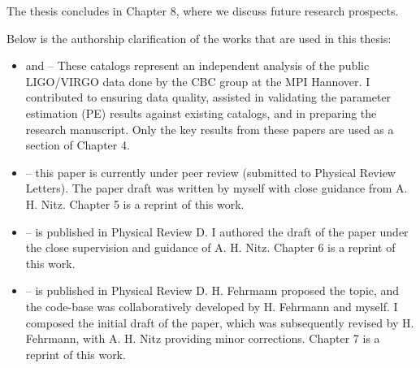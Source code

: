 The thesis concludes in Chapter 8, where we discuss future research prospects. 

Below is the authorship clarification of the works that are used in this thesis:

\begin{itemize}
    \item \cite{Nitz:2021uxj} and \cite{Nitz:2021zwj} -- These catalogs represent an independent analysis of the public LIGO/VIRGO data done by the CBC group at the MPI Hannover. I contributed to ensuring data quality, assisted in validating the parameter estimation (PE) results against existing catalogs, and in preparing the research manuscript. Only the key results from these papers are used as a section of Chapter 4.  
    \item \cite{Dhurkunde:2023qoe} -- this paper is currently under peer review (submitted to Physical Review Letters). The paper draft was written by myself with close guidance from A. H. Nitz. Chapter 5 is a reprint of this work. 
    \item \cite{Dhurkunde:2022aek} -- is published in Physical Review D. I authored the draft of the paper under the close supervision and guidance of A. H. Nitz. Chapter 6 is a reprint of this work.
    \item \cite{Dhurkunde:2021csz} -- is published in Physical Review D. H. Fehrmann proposed the topic, and the code-base was collaboratively developed by H. Fehrmann and myself. I composed the initial draft of the paper, which was subsequently revised by H. Fehrmann, with A. H. Nitz providing minor corrections. Chapter 7 is a reprint of this work.   
\end{itemize} 




